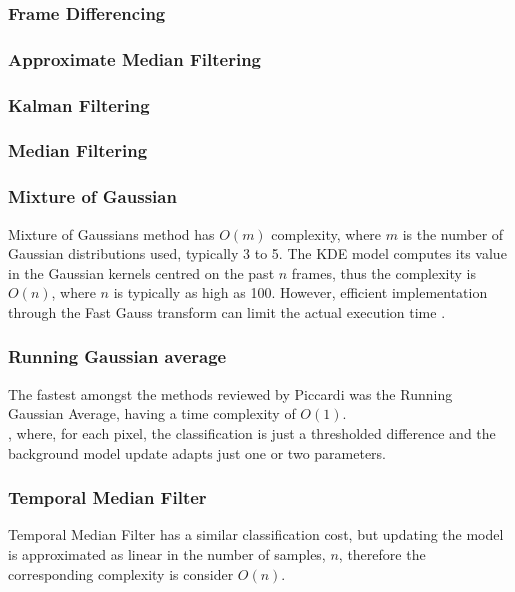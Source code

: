 \subsubsection{Frame Differencing}
\subsubsection{Approximate Median Filtering} \subsubsection{Kalman Filtering}
\subsubsection{Median Filtering}
\subsubsection{Mixture of Gaussian}


Mixture of Gaussians method has $O(m)$ complexity, where $m$ is the number of Gaussian distributions used, typically 3 to 5. 
The KDE model computes its value in the Gaussian kernels centred on the past 
$n$ frames, thus the complexity is $O(n)$, where $n$ is typically as high as 100. 
However, efficient implementation through the Fast Gauss transform can
limit the actual execution time \cite{Elgammal2003}.\\

\subsubsection{Running Gaussian average}

The fastest amongst the methods reviewed by Piccardi \cite{Piccardi2004} was the Running Gaussian Average, having a time complexity of $O(1)$.\\

, where,
for
each
pixel,
the
classification is
just
a thresholded difference and the
background model update adapts
just
one
or
two
parameters.



\subsubsection{Temporal Median Filter}

Temporal Median Filter has a similar classification cost, but updating the  model is approximated as linear in the number of samples, $n$, therefore the corresponding complexity is consider $O(n)$. \\

